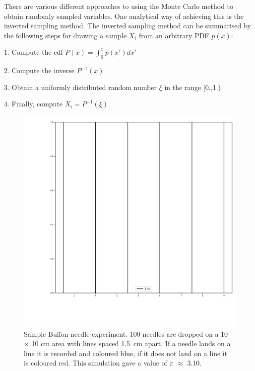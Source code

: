 \medskip

There are various different approaches to using the Monte Carlo method to obtain randomly sampled variables.
One analytical way of achieving this is the inverted sampling method.
The inverted sampling method can be summarised by the following steps for drawing a sample $X_i$ from an arbitrary PDF $p(x)$:

\medskip

1. Compute the \gls*{cdf} $P(x)=\int^{x}_{0}p(x')dx'$

2. Compute the inverse $P^{-1}(x)$

3. Obtain a uniformly distributed random number $\xi$ in the range [0.,1.)

4. Finally, compute $X_i = P^{-1}(\xi)$

\medskip

\begin{figure}[!hbp]
    \centering
    \includegraphics[width=.5\textwidth]{buffon.pdf}
    \caption{Sample Buffon needle experiment. 100 needles are dropped on a 10 $\times$ 10 cm area with lines spaced 1.5~cm apart. If a needle lands on a line it is recorded and coloured blue, if it does not land on a line it is coloured red. This simulation gave a value of $\pi$ $\approx$ 3.10.}
    \label{fig:buffon-needle}
\end{figure}
\FloatBarrier

